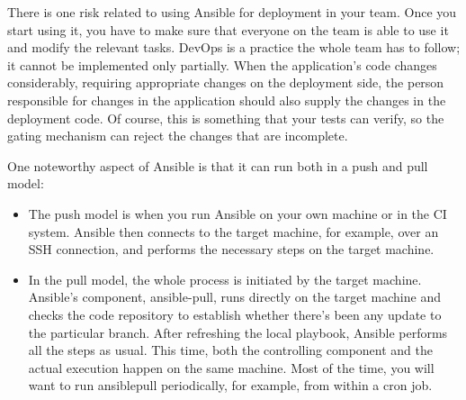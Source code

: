There is one risk related to using Ansible for deployment in your team. Once you start using it, you have to make sure that everyone on the team is able to use it and modify the relevant tasks. DevOps is a practice the whole team has to follow; it cannot be implemented only partially. When the application's code changes considerably, requiring appropriate changes on the deployment side, the person responsible for changes in the application should also supply the changes in the deployment code. Of course, this is something that  your tests can verify, so the gating mechanism can reject the changes that are incomplete. 

One noteworthy aspect of Ansible is that it can run both in a push and pull model:

\begin{itemize}
\item 
The push model is when you run Ansible on your own machine or in the CI system. Ansible then connects to the target machine, for example, over an SSH connection, and performs the necessary steps on the target machine.

\item 
In the pull model, the whole process is initiated by the target machine. Ansible's component, ansible-pull, runs directly on the target machine and checks the code repository to establish whether there's been any update to the particular branch. After refreshing the local playbook, Ansible performs all the steps as usual. This time, both the controlling component and the actual execution happen on the same machine. Most of the time, you will want to run ansiblepull periodically, for example, from within a cron job.
\end{itemize}















